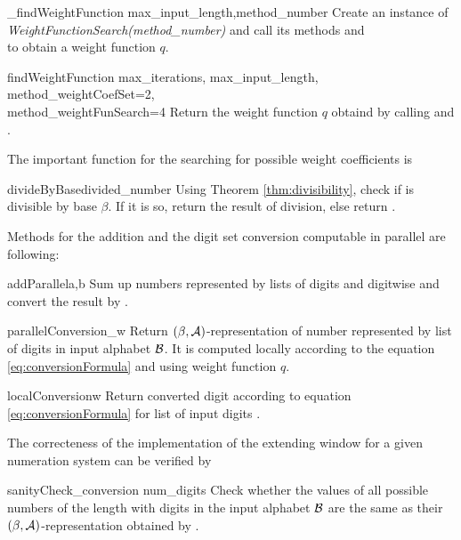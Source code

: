 \begin{method}{\_findWeightFunction}{ max\_input\_length,method\_number}
Create an instance of \emph{WeightFunctionSearch(method\_number)} and call its methods  and \\  to obtain a weight function $q$.
\end{method}


\begin{method}{findWeightFunction}{ max\_iterations, max\_input\_length, method\_weightCoefSet=2,\\ method\_weightFunSearch=4}
Return the weight function $q$ obtaind by calling  and .
\end{method}

The important function for the searching for possible weight coefficients is

\begin{method}{divideByBase}{divided\_number}
Using Theorem \ref{thm:divisibility}, check if  is divisible by base $\beta$. If it is so, return the result of division, else return .
\end{method}


Methods for the addition and the digit set conversion computable in parallel are following:

\begin{method}{addParallel}{a,b}
Sum up numbers represented by lists of digits  and  digitwise and convert the result by . 
\end{method}


\begin{method}{parallelConversion}{\_w}
Return $(\beta,\mathcal{A})$-representation of number represented by list  of digits in input alphabet $\mathcal{B}$. It is computed locally according to the equation \ref{eq:conversionFormula} and using weight function $q$.
\end{method}


\begin{method}{localConversion}{w}
Return converted digit according to equation \ref{eq:conversionFormula} for list of input digits .
\end{method}


The correcteness of the implementation of the extending window for a given numeration system can be verified by
 
\begin{method}{sanityCheck\_conversion}{ num\_digits}
Check whether the values of all possible numbers of the length  with digits in the input alphabet $\mathcal{B}$ are the same as their $(\beta, \mathcal{A})$-representation obtained by .   
\end{method}


